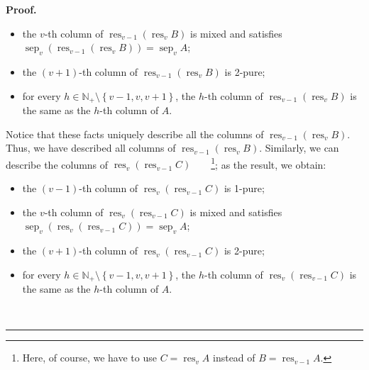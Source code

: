 \documentclass[numbers=enddot,12pt,final,onecolumn,notitlepage]{scrartcl}%
\theoremstyle{definition}
\newenvironment{proof}[1][Proof]{\noindent\textbf{#1.} }{\ \rule{0.5em}{0.5em}}
\newenvironment{verlong}{}{}
\begin{document}
\begin{verlong}
\begin{proof}
\begin{itemize}
\item the $v$-th column of $\operatorname*{res}\nolimits_{v-1}\left(
\operatorname*{res}\nolimits_{v}B\right)  $ is mixed and satisfies
$\operatorname*{sep}\nolimits_{v}\left(  \operatorname*{res}\nolimits_{v-1}%
\left(  \operatorname*{res}\nolimits_{v}B\right)  \right)
=\operatorname*{sep}\nolimits_{v}A$;

\item the $\left(  v+1\right)  $-th column of $\operatorname*{res}%
\nolimits_{v-1}\left(  \operatorname*{res}\nolimits_{v}B\right)  $ is 2-pure;

\item for every $h\in\mathbb{N}_{+}\setminus\left\{  v-1,v,v+1\right\}  $, the
$h$-th column of $\operatorname*{res}\nolimits_{v-1}\left(
\operatorname*{res}\nolimits_{v}B\right)  $ is the same as the $h$-th column
of $A$.
\end{itemize}

Notice that these facts uniquely describe all the columns of
$\operatorname*{res}\nolimits_{v-1}\left(  \operatorname*{res}\nolimits_{v}%
B\right)  $. Thus, we have described all columns of $\operatorname*{res}%
\nolimits_{v-1}\left(  \operatorname*{res}\nolimits_{v}B\right)  $. Similarly,
we can describe the columns of $\operatorname*{res}\nolimits_{v}\left(
\operatorname*{res}\nolimits_{v-1}C\right)  $\ \ \ \ \footnote{Here, of
course, we have to use $C=\operatorname*{res}\nolimits_{v}A$ instead of
$B=\operatorname*{res}\nolimits_{v-1}A$.}; as the result, we obtain:

\begin{itemize}
\item the $\left(  v-1\right)  $-th column of $\operatorname*{res}%
\nolimits_{v}\left(  \operatorname*{res}\nolimits_{v-1}C\right)  $ is 1-pure;

\item the $v$-th column of $\operatorname*{res}\nolimits_{v}\left(
\operatorname*{res}\nolimits_{v-1}C\right)  $ is mixed and satisfies
$\operatorname*{sep}\nolimits_{v}\left(  \operatorname*{res}\nolimits_{v}%
\left(  \operatorname*{res}\nolimits_{v-1}C\right)  \right)
=\operatorname*{sep}\nolimits_{v}A$;

\item the $\left(  v+1\right)  $-th column of $\operatorname*{res}%
\nolimits_{v}\left(  \operatorname*{res}\nolimits_{v-1}C\right)  $ is 2-pure;

\item for every $h\in\mathbb{N}_{+}\setminus\left\{  v-1,v,v+1\right\}  $, the
$h$-th column of $\operatorname*{res}\nolimits_{v}\left(  \operatorname*{res}%
\nolimits_{v-1}C\right)  $ is the same as the $h$-th column of $A$.
\end{itemize}


\end{proof}
\end{verlong}
\end{document}
